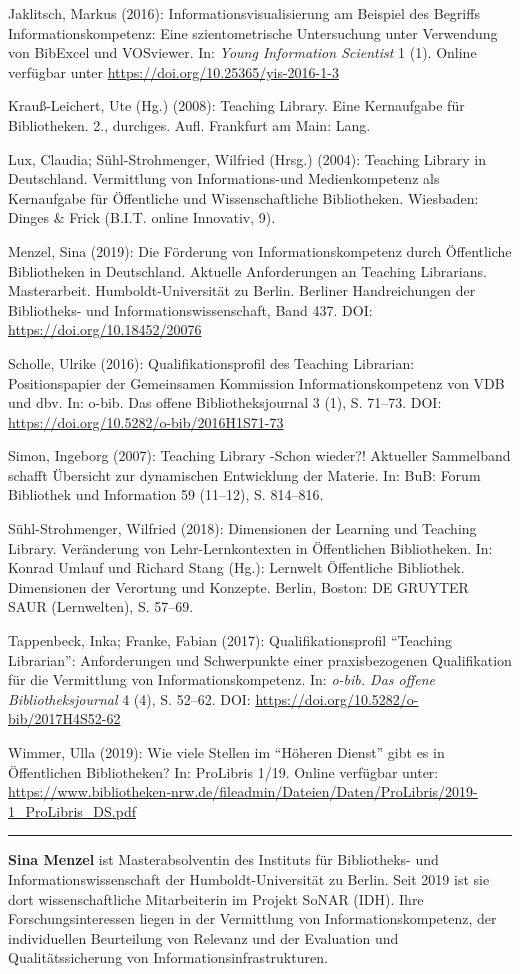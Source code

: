 \documentclass[a4paper,
fontsize=11pt,
oneside,
numbers=noperiodatend,
parskip=half-,
bibliography=totoc,
final
]{scrartcl}
\begin{document}
Jaklitsch, Markus (2016): Informationsvisualisierung am Beispiel des
Begriffs Informationskompetenz: Eine szientometrische Untersuchung unter
Verwendung von BibExcel und VOSviewer. In: \emph{Young Information
Scientist} 1 (1). Online verfügbar unter
\url{https://doi.org/10.25365/yis-2016-1-3}

Krauß-Leichert, Ute (Hg.) (2008): Teaching Library. Eine Kernaufgabe für
Bibliotheken. 2., durchges. Aufl. Frankfurt am Main: Lang.

Lux, Claudia; Sühl-Strohmenger, Wilfried (Hrsg.) (2004): Teaching
Library in Deutschland. Vermittlung von Informations-und Medienkompetenz
als Kernaufgabe für Öffentliche und Wissenschaftliche Bibliotheken.
Wiesbaden: Dinges \& Frick (B.I.T. online Innovativ, 9).

Menzel, Sina (2019): Die Förderung von Informationskompetenz durch
Öffentliche Bibliotheken in Deutschland. Aktuelle Anforderungen an
Teaching Librarians. Masterarbeit. Humboldt-Universität zu Berlin.
Berliner Handreichungen der Bibliotheks- und Informationswissenschaft,
Band 437. DOI: \url{https://doi.org/10.18452/20076}

Scholle, Ulrike (2016): Qualifikationsprofil des Teaching Librarian:
Positionspapier der Gemeinsamen Kommission Informationskompetenz von VDB
und dbv. In: o-bib. Das offene Bibliotheksjournal 3 (1), S. 71--73. DOI:
\url{https://doi.org/10.5282/o-bib/2016H1S71-73}

Simon, Ingeborg (2007): Teaching Library -Schon wieder?! Aktueller
Sammelband schafft Übersicht zur dynamischen Entwicklung der Materie.
In: BuB: Forum Bibliothek und Information 59 (11--12), S. 814--816.

Sühl-Strohmenger, Wilfried (2018): Dimensionen der Learning und Teaching
Library. Veränderung von Lehr-Lernkontexten in Öffentlichen
Bibliotheken. In: Konrad Umlauf und Richard Stang (Hg.): Lernwelt
Öffentliche Bibliothek. Dimensionen der Verortung und Konzepte. Berlin,
Boston: DE GRUYTER SAUR (Lernwelten), S. 57--69.

Tappenbeck, Inka; Franke, Fabian (2017): Qualifikationsprofil
\enquote{Teaching Librarian}: Anforderungen und Schwerpunkte einer
praxisbezogenen Qualifikation für die Vermittlung von
Informationskompetenz. In: \emph{o-bib. Das offene Bibliotheksjournal} 4
(4), S. 52--62. DOI: \url{https://doi.org/10.5282/o-bib/2017H4S52-62}

Wimmer, Ulla (2019): Wie viele Stellen im \enquote{Höheren Dienst} gibt
es in Öffentlichen Bibliotheken? In: ProLibris 1/19. Online verfügbar
unter:
\url{https://www.bibliotheken-nrw.de/fileadmin/Dateien/Daten/ProLibris/2019-1_ProLibris_DS.pdf}

\begin{center}\rule{0.5\linewidth}{0.5pt}\end{center}

\textbf{Sina Menzel} ist Masterabsolventin des Instituts für
Bibliotheks- und Informationswissenschaft der Humboldt-Universität zu
Berlin. Seit 2019 ist sie dort wissenschaftliche Mitarbeiterin im
Projekt SoNAR (IDH). Ihre Forschungsinteressen liegen in der Vermittlung
von Informationskompetenz, der individuellen Beurteilung von Relevanz
und der Evaluation und Qualitätssicherung von
Informationsinfrastrukturen.
\end{document}
